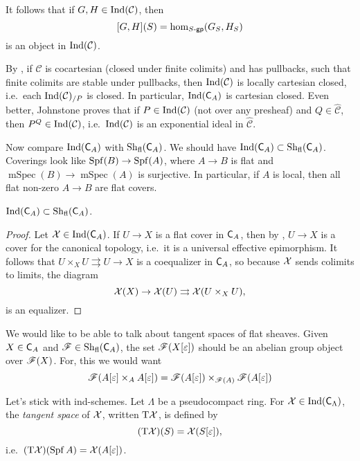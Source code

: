 \documentclass[phd,cornellheadings,draft]{cornell}
\begin{document}
It follows that if $G,H\in \operatorname{Ind}(\mathcal C)$, then 
\[
  [G,H](S) = \hom_{S\textnormal{-}\mathsf{gp}}(G_S,H_S) 
\]
is an object in $\operatorname{Ind}(\mathcal C)$. 

By \cite[C 4.2.3]{johnstone-2002}, if $\mathcal C$ is cocartesian (closed under finite 
colimits) and has pullbacks, such that finite colimits are stable under pullbacks, 
then $\operatorname{Ind}(\mathcal C)$ is locally cartesian closed, i.e.~each 
$\operatorname{Ind}(\mathcal C)_{/P}$ is closed. In particular, 
$\operatorname{Ind}(\mathsf{C}_A)$ is cartesian closed. Even better, Johnstone proves that 
if $P\in \operatorname{Ind}(\mathcal C)$ (not over any presheaf) and $Q\in \widehat{\mathcal C}$,
then $P^Q\in\operatorname{Ind}(\mathcal C)$, i.e.~$\operatorname{Ind}(\mathcal C)$ is an exponential 
ideal in $\widehat{\mathcal C}$. 

Now compare $\operatorname{Ind}(\mathsf{C}_A)$ with $\operatorname{Sh}_\mathrm{fl}(\mathsf{C}_A)$. 
We should have $\operatorname{Ind}(\mathsf{C}_A)\subset \operatorname{Sh}_\mathrm{fl}(\mathsf{C}_A)$. 
Coverings look like $\operatorname{Spf}(B)\to \operatorname{Spf}(A)$, where $A\to B$ is flat and 
$\operatorname{mSpec}(B)\to \operatorname{mSpec}(A)$ is surjective. In particular, if 
$A$ is local, then all flat non-zero $A\to B$ are flat covers. 


\begin{theorem}
$\operatorname{Ind}(\mathsf{C}_A)\subset \operatorname{Sh}_\mathrm{fl}(\mathsf{C}_A)$. 
\end{theorem}
\begin{proof}
Let $\mathcal{X}\in \operatorname{Ind}(\mathsf{C}_A)$. If $U\to X$ is a flat 
cover in $\mathsf{C}_A$, then by \cite[IV 6.3.1(iii)]{sga3-i}, $U\to X$ is a 
cover for the canonical topology, i.e.~it is a universal effective epimorphism. 
It follows that $U\times_X U\rightrightarrows U \to X$ is a coequalizer in 
$\mathsf{C}_A$, so because $\mathcal{X}$ sends colimits to limits, the diagram  
\[
  \mathcal{X}(X) \to \mathcal{X}(U) \rightrightarrows \mathcal{X}(U\times_X U) ,
\]
is an equalizer. 
\end{proof}

We would like to be able to talk about tangent spaces of flat sheaves. Given 
$X\in \mathsf{C}_A$ and $\mathscr F\in \operatorname{Sh}_\mathrm{fl}(\mathsf{C}_A)$, 
the set $\mathscr{F}(X[\varepsilon])$ should be an abelian group object over 
$\mathscr{F}(X)$. For, this we would want 
\[
  \mathscr{F}(A[\varepsilon]\times_A A[\varepsilon]) = \mathscr{F}(A[\varepsilon])\times_{\mathscr{F}(A)} \mathscr{F}(A[\varepsilon])
\]

Let's stick with ind-schemes. Let $\Lambda$ be a pseudocompact ring. For 
$\mathcal{X}\in \operatorname{Ind}(\mathsf{C}_\Lambda)$, the \emph{tangent space} of $\mathcal{X}$, 
written $\mathrm{T}\mathcal{X}$, is defined by 
\[
  (\mathrm{T}\mathcal{X})(S) = \mathcal{X}(S[\varepsilon]), 
\]
i.e.~$(\mathrm{T}\mathcal{X})(\operatorname{Spf} A) = \mathcal{X}(A[\varepsilon])$. 
\end{document}
